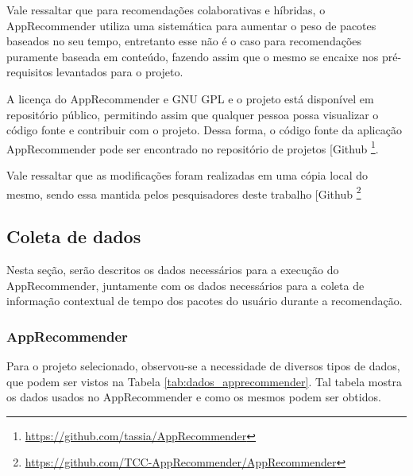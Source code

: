 Vale ressaltar que para recomendações colaborativas e híbridas, o AppRecommender
utiliza uma sistemática para aumentar o peso de pacotes baseados no seu tempo,
entretanto esse não é o caso para recomendações puramente baseada em conteúdo,
fazendo assim que o mesmo se encaixe nos pré-requisitos levantados para o
projeto.

A licença do AppRecommender e GNU GPL e o projeto está disponível em repositório
público, permitindo assim que qualquer pessoa possa visualizar o código fonte e
contribuir com o projeto. Dessa forma, o código fonte da aplicação
AppRecommender pode ser encontrado no repositório de projetos [Github \footnote{\url{https://github.com/tassia/AppRecommender}}.

Vale ressaltar que as modificações foram realizadas em uma cópia local do 
mesmo, sendo essa mantida pelos pesquisadores deste trabalho [Github \footnote{\url{https://github.com/TCC-AppRecommender/AppRecommender}}

\subsection{Coleta de dados}

Nesta seção, serão descritos os dados necessários para a execução do
AppRecommender, juntamente com os dados necessários para a coleta de
informação contextual de tempo dos pacotes do usuário durante a
recomendação.

\subsubsection{AppRecommender}

Para o projeto selecionado, observou-se a necessidade de diversos tipos
de dados, que podem ser vistos na Tabela
\ref{tab:dados_apprecommender}. Tal tabela mostra os dados usados no
AppRecommender e como os mesmos podem ser obtidos.

